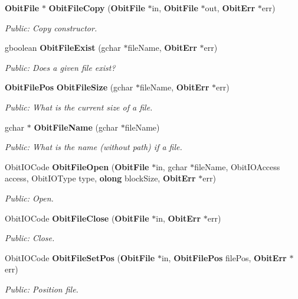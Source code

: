 \begin{CompactItemize}
{\bf Obit\-File} $\ast$ {\bf Obit\-File\-Copy} ({\bf Obit\-File} $\ast$in, {\bf Obit\-File} $\ast$out, {\bf Obit\-Err} $\ast$err)
\begin{CompactList}\small\item\em Public: Copy constructor. \item\end{CompactList}\item 
gboolean {\bf Obit\-File\-Exist} (gchar $\ast$file\-Name, {\bf Obit\-Err} $\ast$err)
\begin{CompactList}\small\item\em Public: Does a given file exist? \item\end{CompactList}\item 
{\bf Obit\-File\-Pos} {\bf Obit\-File\-Size} (gchar $\ast$file\-Name, {\bf Obit\-Err} $\ast$err)
\begin{CompactList}\small\item\em Public: What is the current size of a file. \item\end{CompactList}\item 
gchar $\ast$ {\bf Obit\-File\-Name} (gchar $\ast$file\-Name)
\begin{CompactList}\small\item\em Public: What is the name (without path) if a file. \item\end{CompactList}\item 
Obit\-IOCode {\bf Obit\-File\-Open} ({\bf Obit\-File} $\ast$in, gchar $\ast$file\-Name, Obit\-IOAccess access, Obit\-IOType type, {\bf olong} block\-Size, {\bf Obit\-Err} $\ast$err)
\begin{CompactList}\small\item\em Public: Open. \item\end{CompactList}\item 
Obit\-IOCode {\bf Obit\-File\-Close} ({\bf Obit\-File} $\ast$in, {\bf Obit\-Err} $\ast$err)
\begin{CompactList}\small\item\em Public: Close. \item\end{CompactList}\item 
Obit\-IOCode {\bf Obit\-File\-Set\-Pos} ({\bf Obit\-File} $\ast$in, {\bf Obit\-File\-Pos} file\-Pos, {\bf Obit\-Err} $\ast$err)
\begin{CompactList}\small\item\em Public: Position file. \item\end{CompactList}\item 

\end{CompactItemize}
